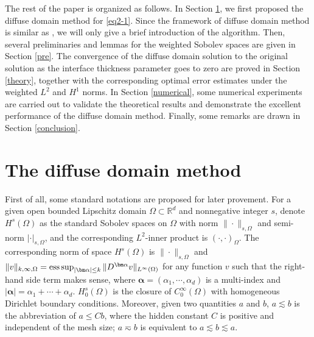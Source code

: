 \documentclass[3p,times]{elsarticle}
\numberwithin{equation}{section}
\begin{document}
The rest of the paper is organized as follows. In Section \ref{algorithm-description}, we first proposed the diffuse domain method for \eqref{eq2-1}. Since the framework of diffuse domain method is similar as \cite{HaoJu2025}, we will only give a brief introduction of the algorithm. Then, several preliminaries and lemmas for the weighted Sobolev spaces are given in Section \ref{pre}. The convergence of the diffuse domain solution to the original solution as the interface thickness parameter goes to zero are proved in  Section \ref{theory}, together with the corresponding optimal error estimates under the weighted $L^2$ and $H^1$ norms. In Section \ref{numerical},  some numerical experiments are carried out to validate the theoretical results and demonstrate the excellent performance of the diffuse domain method. Finally, some remarks are drawn in Section \ref{conclusion}.



\section{The diffuse domain method}\label{algorithm-description}

First of all, some standard notations are proposed for later provement. For a given open bounded Lipschitz domain $\Omega \subset \mathbb{R}^d$ and nonnegative integer $s$, denote $H^s(\Omega)$ as the standard Sobolev spaces on $\Omega$ with norm $\|\cdot\|_{s,\Omega}$ and semi-norm $|\cdot|_{s,\Omega}$, and the corresponding $L^2$-inner product is $(\cdot,\cdot)_{\Omega}$. The corresponding norm of space $H^s(\Omega)$ is $\|\cdot\|_{s,\Omega}$ and $\|v\|_{k,\infty,\Omega}={\rm ess}\sup_{|\bm \alpha|\leq k}\|D^{\bm \alpha}v\|_{L^{\infty}(\Omega)}$ for any function $v$ such that the right-hand side term makes sense, where $\bm \alpha=(\alpha_1, \cdots, \alpha_d)$ is a multi-index and $|\bm \alpha|=\alpha_1+\cdots+\alpha_d$. $H_0^s(\Omega)$ is the closure of $C_0^{\infty}(\Omega)$ with homogeneous Dirichlet boundary conditions. 
Moreover, given two quantities $a$ and $b$, $a \lesssim b$ is the abbreviation of $a \leq Cb$, where the hidden constant $C$ is positive and independent of the mesh size; $a\eqsim b$ is equivalent to $a\lesssim b \lesssim a$.
\end{document}

